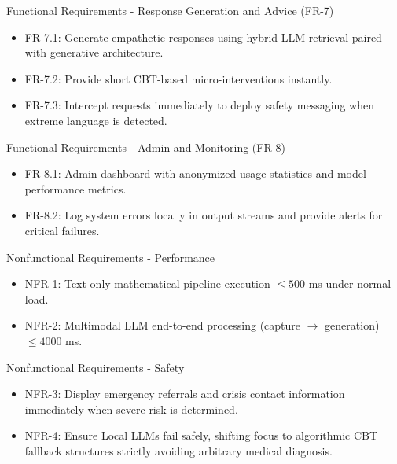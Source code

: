 \documentclass[11pt]{beamer}
\begin{document}
\begin{frame}{Functional Requirements - Response Generation and Advice (FR-7)}
\begin{itemize}
    \item FR-7.1: Generate empathetic responses using hybrid LLM retrieval paired with generative architecture.
    \item FR-7.2: Provide short CBT-based micro-interventions instantly.
    \item FR-7.3: Intercept requests immediately to deploy safety messaging when extreme language is detected.
\end{itemize}
\end{frame}

\begin{frame}{Functional Requirements - Admin and Monitoring (FR-8)}
\begin{itemize}
    \item FR-8.1: Admin dashboard with anonymized usage statistics and model performance metrics.
    \item FR-8.2: Log system errors locally in output streams and provide alerts for critical failures.
\end{itemize}
\end{frame}


\begin{frame}{Nonfunctional Requirements - Performance}
\begin{itemize}
    \item NFR-1: Text-only mathematical pipeline execution $\leq 500$ ms under normal load.
    \item NFR-2: Multimodal LLM end-to-end processing (capture $\to$ generation) $\leq 4000$ ms.
\end{itemize}
\end{frame}

\begin{frame}{Nonfunctional Requirements - Safety}
\begin{itemize}
    \item NFR-3: Display emergency referrals and crisis contact information immediately when severe risk is determined.
    \item NFR-4: Ensure Local LLMs fail safely, shifting focus to algorithmic CBT fallback structures strictly avoiding arbitrary medical diagnosis.
\end{itemize}
\end{frame}
\end{document}

